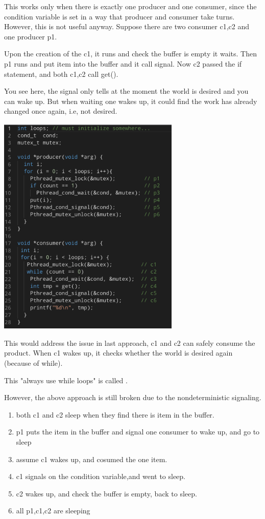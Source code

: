     This works only when there is exactly one producer and one consumer, since the condition variable is set 
    in a way that producer and consumer take turns.
    However, this is not useful anyway. Suppose there are two consumer c1,c2 and one producer p1.

    Upon the creation of the c1, it runs and check the buffer is empty it waits. Then p1 runs and put item 
    into the buffer and it call signal. Now c2 passed the if statement, and both c1,c2 call get().

    You see here, the signal only tells at the moment the world is desired and you can wake up. But when 
    waiting one wakes up, it could find the work has already changed once again, i.e, not desired.

    \vspace*{5mm}
    

    \includegraphics[width=0.65\textwidth]{chapters/Cucurrency/Cucurrency/better_broken_pc.png}

    This would address the issue in last approach, c1 and c2 can safely consume the product.
    When c1 wakes up, it checks whether the world is desired again (because of while). 

    This "always use while loops" is called .

    However, the above approach is still broken due to the nondeterministic signaling.

    \begin{enumerate}
        \item both c1 and c2 sleep when they find there is item in the buffer.
        \item p1 puts the item in the buffer and signal one consumer to wake up, and go to sleep
        \item assume c1 wakes up, and cosumed the one item.
        \item c1 signals on the condition variable,and went to sleep.
        \item c2 wakes up, and check the buffer is empty, back to sleep.
        \item all p1,c1,c2 are sleeping
    \end{enumerate}

